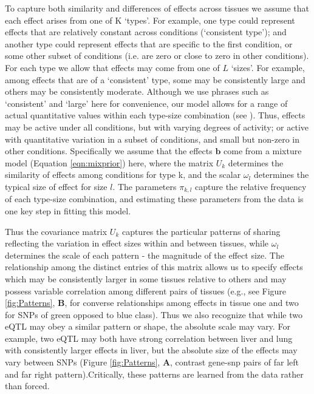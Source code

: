 To capture both similarity and differences of effects across tissues we assume that each effect arises from one of K `types'. For example, one type could represent effects that are relatively constant across conditions (`consistent type'); and another type could represent effects that are specific to the first condition, or some other subset of conditions (i.e. are zero or close to zero in other conditions). For each type we allow that effects may come from one of $L$ `sizes'. For example, among effects that are of a `consistent' type, some may be consistently large and others may be consistently moderate.
Although we use phrases such as `consistent' and `large' here for convenience, our model allows for a range of actual quantitative values within each type-size combination (see \label{fig:Patterns}
). Thus, effects may be active under all conditions, but with varying degrees of activity; or active with quantitative variation in a subset of conditions, and small but non-zero in other conditions. Specifically we assume that the effects $\bm{b}$ come from a mixture model (Equation \ref{eqn:mixprior}) here, where the matrix $U_{k}$  determines the similarity of effects among conditions for type k,  and the scalar $\omega_{l}$ determines the typical size of effect for size $l$. The parameters $\pi_{k,l}$ capture the relative frequency of each type-size combination, and estimating these parameters from the data is one key step in fitting this model. 

Thus the covariance matrix $U_{k}$ captures the particular patterns of sharing reflecting the variation in effect sizes within and between tissues, while $\omega_{l}$ determines the scale of each pattern - the magnitude of the effect size. The relationship among the distinct entries of this matrix allows us to specify effects which may be consistently larger in some tissues relative to others and may possess variable correlation among different pairs of tissues (e.g., see Figure \ref{fig:Patterns}, \textbf{B}, for converse relationships among effects in tissue one and two for SNPs of green opposed to blue class). Thus we also recognize that while two eQTL may obey a similar pattern or shape, the absolute scale may vary. For example, two eQTL may both have strong correlation between liver and lung with consistently larger effects in liver, but the absolute size of the effects may vary between SNPs (Figure \ref{fig:Patterns}, \textbf{A}, contrast gene-snp pairs of far left and far right pattern).Critically, these patterns are learned from the data rather than forced. 

